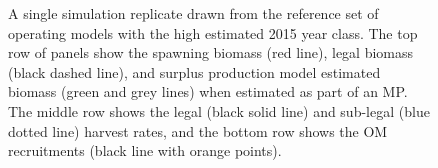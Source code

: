 \documentclass[11pt]{book}
\begin{document}
\newpage
\begin{landscape}
\begin{figure}[htb]

{\centering {} 

}

\caption{A single simulation replicate drawn from the reference set of operating models with the high estimated 2015 year class. The top row of panels show the spawning biomass (red line), legal biomass (black dashed line), and surplus production model estimated biomass (green and grey lines) when estimated as part of an MP. The middle row shows the legal (black solid line) and sub-legal (blue dotted line) harvest rates, and the bottom row shows the OM recruitments (black line with orange points).}\label{fig:unnamed-chunk-21}
\end{figure}
\newpage
\begin{figure}[htb]

{\centering {} 

}
\end{figure}
\end{landscape}
\end{document}
